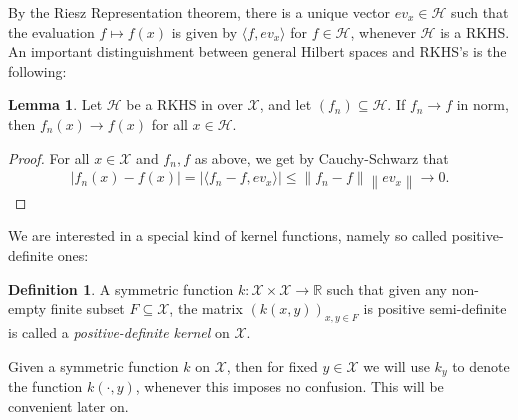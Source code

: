 \documentclass[10pt,twoside,openany,final]{memoir}
\theoremstyle{definition}
\newtheorem{lemma}[theorem]{Lemma}
\newtheorem{definition}[theorem]{Definition}
\theoremstyle{Break}
\newcommand{\lv}{\left\lVert}
\newcommand{\rv}{\right\rVert}
\newcommand{\R}{\mathbb{R}}
\renewcommand{\H}{\mathcal{H}}
\begin{document}
By the Riesz Representation theorem, there is a unique vector $ev_x \in \H$ such that the evaluation $f \mapsto f(x)$ is given by $\langle f , ev_x\rangle$ for $f \in \H$, whenever $\H$ is a RKHS. An important distinguishment between general Hilbert spaces and RKHS's is the following:
\begin{lemma}
	Let $\H$ be a RKHS in over $\mathcal{X}$, and let $ (f_n) \subseteq \H$. If $f_n \to f$ in norm, then $f_n(x) \to f(x)$ for all $x \in \H$.
	\label{paul3.2}
\end{lemma}
\begin{proof}
	For all $x \in \mathcal{X}$ and $f_n, f$ as above, we get by Cauchy-Schwarz that
	\begin{align*}
		|f_n(x) - f(x) | = | \langle f_n-f , ev_x \rangle| \leq \lv f_n - f \rv \lv ev_x \rv \to 0.
	\end{align*}
\end{proof}
We are interested in a special kind of kernel functions, namely so called positive-definite ones:
\begin{definition}
	A symmetric function $k \colon \mathcal{X} \times \mathcal{X} \to \R$ such that given any non-empty finite subset $F \subseteq \mathcal{X}$, the matrix $(k(x,y))_{x,y \in F}$ is positive semi-definite is called a \emph{positive-definite kernel} on $\mathcal{X}$.
\end{definition}
Given a symmetric function $k$ on $\mathcal{X}$, then for fixed $y \in \mathcal{X}$ we will use $k_y$ to denote the function $k(\cdot,y)$, whenever this imposes no confusion. This will be convenient later on.
\end{document}
